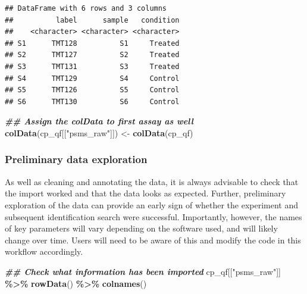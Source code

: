 \documentclass[9pt,a4paper,]{extarticle}
\newenvironment{Shaded}{\begin{snugshade}}{\end{snugshade}}
\newcommand{\DocumentationTok}[1]{\textcolor[rgb]{0.56,0.35,0.01}{\textbf{\textit{#1}}}}
\newcommand{\FunctionTok}[1]{\textcolor[rgb]{0.13,0.29,0.53}{\textbf{#1}}}
\newcommand{\NormalTok}[1]{#1}
\newcommand{\OtherTok}[1]{\textcolor[rgb]{0.56,0.35,0.01}{#1}}
\newcommand{\SpecialCharTok}[1]{\textcolor[rgb]{0.81,0.36,0.00}{\textbf{#1}}}
\newcommand{\StringTok}[1]{\textcolor[rgb]{0.31,0.60,0.02}{#1}}
\begin{document}
\begin{verbatim}
## DataFrame with 6 rows and 3 columns
##          label      sample   condition
##    <character> <character> <character>
## S1      TMT128          S1     Treated
## S2      TMT127          S2     Treated
## S3      TMT131          S3     Treated
## S4      TMT129          S4     Control
## S5      TMT126          S5     Control
## S6      TMT130          S6     Control
\end{verbatim}

\begin{Shaded}
\begin{Highlighting}[]
\DocumentationTok{\#\# Assign the colData to first assay as well}
\FunctionTok{colData}\NormalTok{(cp\_qf[[}\StringTok{"psms\_raw"}\NormalTok{]]) }\OtherTok{\textless{}{-}} \FunctionTok{colData}\NormalTok{(cp\_qf)}
\end{Highlighting}
\end{Shaded}

\hypertarget{preliminary-data-exploration}{%
\subsubsection{Preliminary data exploration}\label{preliminary-data-exploration}}

As well as cleaning and annotating the data, it is always advisable to check
that the import worked and that the data looks as expected. Further, preliminary
exploration of the data can provide an early sign of whether the experiment and
subsequent identification search were successful. Importantly, however, the
names of key parameters will vary depending on the software used, and will
likely change over time. Users will need to be aware of this and modify the code
in this workflow accordingly.

\begin{Shaded}
\begin{Highlighting}[]
\DocumentationTok{\#\# Check what information has been imported}
\NormalTok{cp\_qf[[}\StringTok{"psms\_raw"}\NormalTok{]] }\SpecialCharTok{\%\textgreater{}\%}
  \FunctionTok{rowData}\NormalTok{() }\SpecialCharTok{\%\textgreater{}\%}
  \FunctionTok{colnames}\NormalTok{()}
\end{Highlighting}
\end{Shaded}
\end{document}
